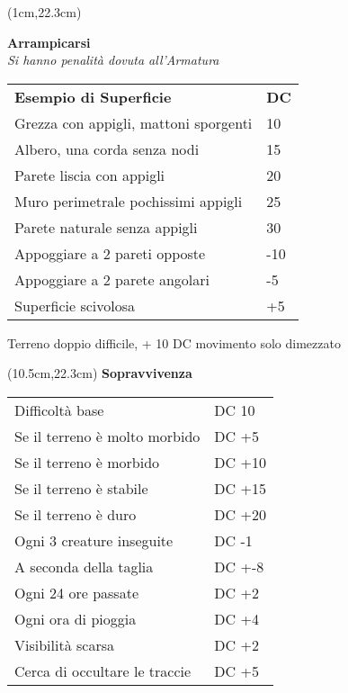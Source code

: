 \documentclass[a4paper,12 pt,openany]{book}
\begin{document}
\begin{textblock*}{9cm}(1cm,22.3cm) %

\textbf{Arrampicarsi}\\
\textit{Si hanno penalità dovuta all'Armatura}

\begin{tabular}{ll}
	\textbf{Esempio di Superficie} & \textbf{DC}\\
	Grezza con appigli, mattoni sporgenti&10\\
	Albero, una corda senza nodi&15\\
	Parete liscia con appigli &20\\
	Muro perimetrale pochissimi appigli&25\\
	Parete naturale senza appigli&30\\
	Appoggiare a 2 pareti opposte&-10\\
	Appoggiare a 2 parete angolari&-5\\
	Superficie scivolosa&+5\\
\end{tabular}

Terreno doppio difficile, + 10 DC movimento solo dimezzato

\end{textblock*}


	\begin{textblock*}{8cm}(10.5cm,22.3cm) %
\textbf{Sopravvivenza}
\begin{tabular}{ll}
	Difficoltà base  & DC 10\\
	Se il terreno è molto morbido& DC +5\\
	Se il terreno è morbido& DC +10\\
	Se il terreno è stabile& DC +15\\
	Se il terreno è duro& DC +20\\
	Ogni 3 creature inseguite& DC -1\\
	A seconda della taglia& DC +-8\\
	Ogni 24 ore passate&DC +2\\
	Ogni ora di pioggia&DC +4\\
	Visibilità scarsa&DC +2\\
	Cerca di occultare le traccie&DC +5\\
\end{tabular}\\
\end{textblock*}
\end{document}

